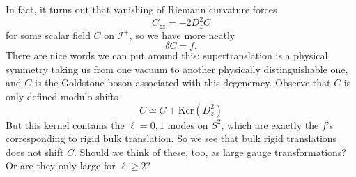 \documentclass[11pt,letterpaper]{article}
\newcommand{\mc}[1]{\mathcal{#1}}
\begin{document}
In fact, it turns out that vanishing of Riemann curvature forces \begin{equation}
C_{zz} = - 2 D_z^2 C
\end{equation}
for some scalar field $C$ on $\mc{I}^+$, so we have more neatly \begin{equation}
\delta C = f.
\end{equation}
There are nice words we can put around this: supertranslation is a physical symmetry taking us from one vacuum to another physically distinguishable one, and $C$ is the Goldstone boson associated with this degeneracy. Observe that $C$ is only defined modulo shifts \begin{equation}
C \simeq C + \mbox{Ker}(D_z^2)
\end{equation}
But this kernel contains the $\ell = 0, 1$ modes on $S^2$, which are exactly the $f$'s corresponding to rigid bulk translation. So we see that bulk rigid translations does not shift $C$. Should we think of these, too, as large gauge transformations? Or are they only large for $\ell \geq 2$?
\end{document}
